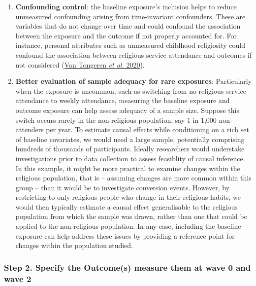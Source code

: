 \documentclass[
  singlecolumn]{article}
\begin{document}
\begin{enumerate}
\def\labelenumi{\arabic{enumi}.}
\setcounter{enumi}{1}
\item
  \textbf{Confounding control}: the baseline exposure's inclusion helps
  to reduce unmeasured confounding arising from time-invariant
  confounders. These are variables that do not change over time and
  could confound the association between the exposure and the outcome if
  not properly accounted for. For instance, personal attributes such as
  unmeasured childhood religiosity could confound the association
  between religious service attendance and outcomes if not considered
  (\protect\hyperlink{ref-vantongeren2020}{Van Tongeren \emph{et al.}
  2020}).
\item
  \textbf{Better evaluation of sample adequacy for rare exposures}:
  Particularly when the exposure is uncommon, such as switching from no
  religious service attendance to weekly attendance, measuring the
  baseline exposure and outcome exposure can help assess adequacy of a
  sample size. Suppose this switch occurs rarely in the non-religious
  population, say 1 in 1,000 non-attenders per year. To estimate causal
  effects while conditioning on a rich set of baseline covariates, we
  would need a large sample, potentially comprising hundreds of
  thousands of participants. Ideally researchers would understake
  investigations prior to data collection to assess feasiblity of causal
  inference. In this example, it might be more practical to examine
  changes within the religious population, that is -- assuming changes
  are more common within this group -- than it would be to investigate
  conversion events. However, by restricting to only religious people
  who change in their religious habits, we would then typically estimate
  a causal effect generalisable to the religious population from which
  the sample was drawn, rather than one that could be applied to the
  non-religious population. In any case, including the baseline exposure
  can help address these issues by providing a reference point for
  changes within the population studied.
\end{enumerate}

\hypertarget{step-2.-specify-the-outcomes-measure-them-at-wave-0-and-wave-2}{%
\subsubsection{Step 2. Specify the Outcome(s) measure them at wave 0 and
wave
2}\label{step-2.-specify-the-outcomes-measure-them-at-wave-0-and-wave-2}}
\end{document}
